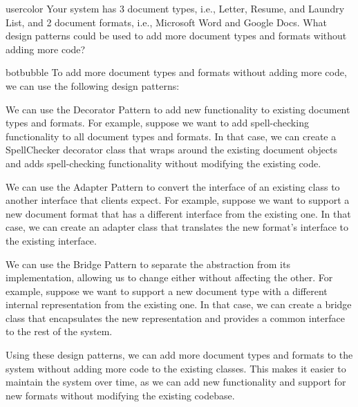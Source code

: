 \begin{chatquest}{usercolor}{}
Your system has 3 document types, i.e., Letter, Resume, and Laundry List, and 2 document formats, i.e., Microsoft Word and Google Docs. What design patterns could be used to add more document types and formats without adding more code?
\end{chatquest}

\begin{chatout}{botbubble}{}
To add more document types and formats without adding more code, we can use the following design patterns:

 We can use the Decorator Pattern to add new functionality to existing document types and formats. For example, suppose we want to add spell-checking functionality to all document types and formats. In that case, we can create a SpellChecker decorator class that wraps around the existing document objects and adds spell-checking functionality without modifying the existing code.

 We can use the Adapter Pattern to convert the interface of an existing class to another interface that clients expect. For example, suppose we want to support a new document format that has a different interface from the existing one. In that case, we can create an adapter class that translates the new format's interface to the existing interface.

 We can use the Bridge Pattern to separate the abstraction from its implementation, allowing us to change either without affecting the other. For example, suppose we want to support a new document type with a different internal representation from the existing one. In that case, we can create a bridge class that encapsulates the new representation and provides a common interface to the rest of the system.

Using these design patterns, we can add more document types and formats to the system without adding more code to the existing classes. This makes it easier to maintain the system over time, as we can add new functionality and support for new formats without modifying the existing codebase.
\end{chatout}


